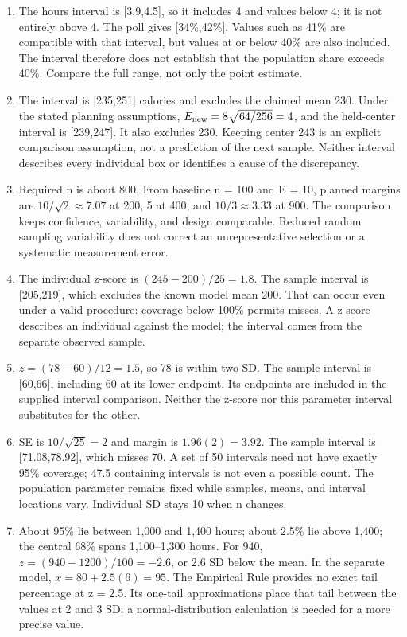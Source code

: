 \documentclass[11pt,letterpaper]{article}
\begin{document}
{\begin{enumerate}
\newpage
\item The hours interval is [3.9,4.5], so it includes 4 and values below 4; it is not entirely above 4. The poll gives [34\%,42\%]. Values such as 41\% are compatible with that interval, but values at or below 40\% are also included. The interval therefore does not establish that the population share exceeds 40\%. Compare the full range, not only the point estimate.
\item The interval is [235,251] calories and excludes the claimed mean 230. Under the stated planning assumptions, $E_{\rm new}=8\sqrt{64/256}=4$, and the held-center interval is [239,247]. It also excludes 230. Keeping center 243 is an explicit comparison assumption, not a prediction of the next sample. Neither interval describes every individual box or identifies a cause of the discrepancy.
\item Required n is about 800. From baseline n = 100 and E = 10, planned margins are $10/\sqrt2\approx7.07$ at 200, 5 at 400, and $10/3\approx3.33$ at 900. The comparison keeps confidence, variability, and design comparable. Reduced random sampling variability does not correct an unrepresentative selection or a systematic measurement error.
\item The individual z-score is $(245-200)/25=1.8$. The sample interval is [205,219], which excludes the known model mean 200. That can occur even under a valid procedure: coverage below 100\% permits misses. A z-score describes an individual against the model; the interval comes from the separate observed sample.
\item $z=(78-60)/12=1.5$, so 78 is within two SD. The sample interval is [60,66], including 60 at its lower endpoint. Its endpoints are included in the supplied interval comparison. Neither the z-score nor this parameter interval substitutes for the other.
\item SE is $10/\sqrt{25}=2$ and margin is $1.96(2)=3.92$. The sample interval is [71.08,78.92], which misses 70. A set of 50 intervals need not have exactly 95\% coverage; 47.5 containing intervals is not even a possible count. The population parameter remains fixed while samples, means, and interval locations vary. Individual SD stays 10 when n changes.
\newpage
\item About 95\% lie between 1,000 and 1,400 hours; about 2.5\% lie above 1,400; the central 68\% spans 1,100--1,300 hours. For 940, $z=(940-1200)/100=-2.6$, or 2.6 SD below the mean. In the separate model, $x=80+2.5(6)=95$. The Empirical Rule provides no exact tail percentage at z = 2.5. Its one-tail approximations place that tail between the values at 2 and 3 SD; a normal-distribution calculation is needed for a more precise value.

\end{enumerate}}
\end{document}
